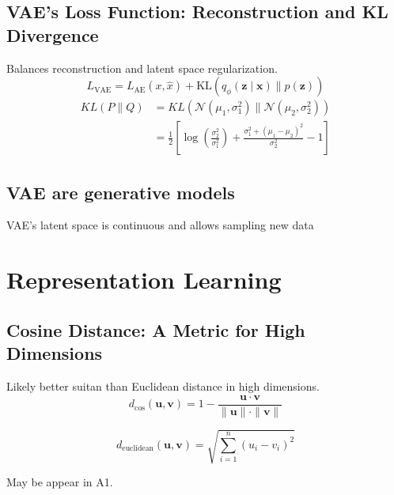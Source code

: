 \subsection{VAE's Loss Function: Reconstruction and KL Divergence}
\begin{definition}
    Balances reconstruction and latent space regularization.
    \begin{equation}
        L_{\text{VAE}} = L_{\text{AE}} (x, \hat{x}) + \text{KL} (q_\phi (\mathbf{z} \mid \mathbf{x}) \parallel p(\mathbf{z}))
    \end{equation}
    \begin{align*}
        KL(P \| Q) &= KL\left(\mathcal{N}(\mu_1, \sigma_1^2) \| \mathcal{N}(\mu_2, \sigma_2^2)\right) \\
        &= \frac{1}{2} \left[ \log\left(\frac{\sigma_2^2}{\sigma_1^2}\right) 
        + \frac{\sigma_1^2 + (\mu_1 - \mu_2)^2}{\sigma_2^2} - 1 \right]
    \end{align*}
\end{definition}

\subsection{VAE are generative models}
\begin{definition}
    VAE's latent space is continuous and allows sampling new data
\end{definition}
\newpage

\section{Representation Learning}

\subsection{Cosine Distance: A Metric for High Dimensions}
\begin{definition}
    Likely better suitan than Euclidean distance in high dimensions.
    \[
    d_{\text{cos}}(\mathbf{u}, \mathbf{v}) = 1 - \frac{\mathbf{u} \cdot \mathbf{v}}{\|\mathbf{u}\| \cdot \|\mathbf{v}\|}
    \]

    \[
    d_{\text{euclidean}}(\mathbf{u}, \mathbf{v}) = \sqrt{\sum_{i=1}^n (u_i - v_i)^2}
    \]
\end{definition}

\begin{warning}
    May be appear in A1.
\end{warning}

